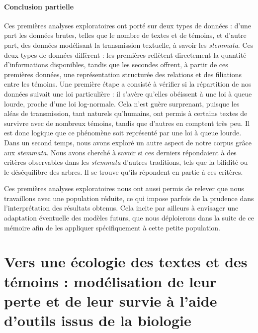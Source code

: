 \documentclass[a4paper,twoside,12pt]{book}
\begin{document}
\subsection{Conclusion partielle}

Ces premières analyses exploratoires ont porté sur deux types de données : d’une part les données brutes, telles que le nombre de textes et de témoins, et d’autre part, des données modélisant la transmission textuelle, à savoir les \textit{stemmata}. Ces deux types de données diffèrent : les premières reflètent directement la quantité d’informations disponibles, tandis que les secondes offrent, à partir de ces premières données, une représentation structurée des relations et des filiations entre les témoins.
Une première étape a consisté à vérifier si la répartition de nos données suivait une loi particulière : il s’avère qu’elles obéissent à une loi à queue lourde, proche d’une loi log-normale. Cela n’est guère surprenant, puisque les aléas de transmission, tant naturels qu’humains, ont permis à certains textes de survivre avec de nombreux témoins, tandis que d’autres en comptent très peu. Il est donc logique que ce phénomène soit représenté par une loi à queue lourde. Dans un second temps, nous avons exploré un autre aspect de notre corpus grâce aux \textit{stemmata}. Nous avons cherché à savoir si ces derniers répondaient à des critères observables dans les \textit{stemmata} d’autres traditions, tels que la bifidité ou le déséquilibre des arbres. Il se trouve qu'ils répondent en partie à ces critères.

Ces premières analyses exploratoires nous ont aussi permis de relever que nous travaillons avec une population réduite, ce qui impose parfois de la prudence dans l’interprétation des résultats obtenus. Cela incite par ailleurs à envisager une adaptation éventuelle des modèles futurs, que nous déploierons dans la suite de ce mémoire afin de les appliquer spécifiquement à cette petite population.











\mainmatter

\part{Vers une écologie des textes et des témoins : modélisation de leur perte et de leur survie  à l’aide d’outils issus de la biologie}
\end{document}
